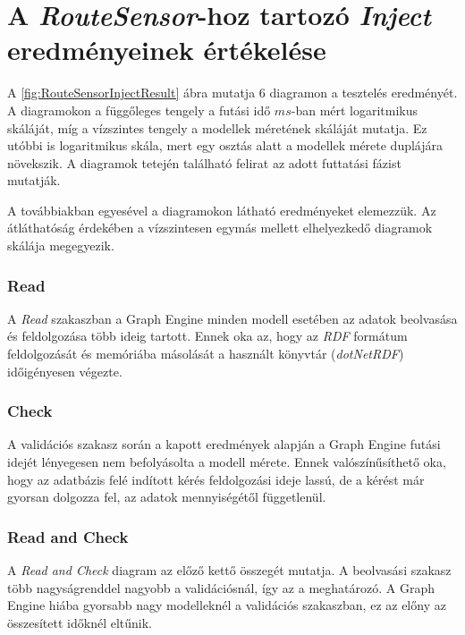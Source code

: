 \section{A \emph{RouteSensor}-hoz tartozó \emph{Inject} eredményeinek értékelése}

A \ref{fig:RouteSensorInjectResult} ábra mutatja 6 diagramon a tesztelés eredményét. A diagramokon a függőleges tengely a futási idő $ms$-ban mért logaritmikus skáláját, míg a vízszintes tengely a modellek méretének skáláját mutatja. Ez utóbbi is logaritmikus skála, mert egy osztás alatt a modellek mérete duplájára növekszik. A diagramok tetején található felirat az adott futtatási fázist mutatják.

A továbbiakban egyesével a diagramokon látható eredményeket elemezzük. Az átláthatóság érdekében a vízszintesen egymás mellett elhelyezkedő diagramok skálája megegyezik.

\subsubsection{Read}

A \emph{Read} szakaszban a Graph Engine minden modell esetében az adatok beolvasása és feldolgozása több ideig tartott. Ennek oka az, hogy az \emph{RDF} formátum feldolgozását és memóriába másolását a használt könyvtár (\emph{dotNetRDF}) időigényesen végezte.

\subsubsection{Check}

A validációs szakasz során a kapott eredmények alapján a Graph Engine futási idejét lényegesen nem befolyásolta a modell mérete. Ennek valószínűsíthető oka, hogy az adatbázis felé indított kérés feldolgozási ideje lassú, de a kérést már gyorsan dolgozza fel, az adatok mennyiségétől függetlenül.

\subsubsection{Read and Check}

A \emph{Read and Check} diagram az előző kettő összegét mutatja. A beolvasási szakasz több nagyságrenddel nagyobb a validációsnál, így az a meghatározó. A Graph Engine hiába gyorsabb nagy modelleknél a validációs szakaszban, ez az előny az összesített időknél eltűnik. 

